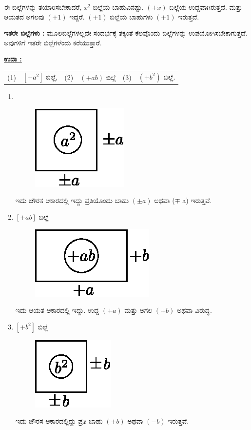 ಈ ಬಿಲ್ಲೆಗಳನ್ನು ತಯಾರಿಸಬೇಕಾದರೆ, $x^2$ ಬಿಲ್ಲೆಯ ಬಾಹುವಿನಷ್ಟು. $(+x)$ ಬಿಲ್ಲೆಯ ಉದ್ದವಾಗಿರುತ್ತದೆ. ಮತ್ತು ಆಯತದ ಅಗಲವು $(+1)$ ಇದ್ದರೆ.  $(+1)$ ಬಿಲ್ಲೆಯ ಬಾಹುಗಳು $(+1)$ ಇರುತ್ತದೆ.

\noindent
\textbf{ಇತರೇ ಬಿಲ್ಲೆಗಳು :} ಮೂಲಬಿಲ್ಲೆಗಳಲ್ಲದೇ ಸಂದರ್ಭಕ್ಕೆ ತಕ್ಕಂತೆ ಕೆಲವೊಂದು ಬಿಲ್ಲೆಗಳನ್ನು ಉಪಯೋಗಿಸಬೇಕಾಗುತ್ತದೆ. ಅವುಗಳಿಗೆ ಇತರೇ ಬಿಲ್ಲೆಗಳೆಂದು ಕರೆಯುತ್ತಾರೆ.

\noindent
{\textbf{\underline{ಉದಾ :}}} 
\begin{tabular}{llllll}
(1) & $[+ a^2]$ ಬಿಲ್ಲೆ, & (2) & $(+ab)$ ಬಿಲ್ಲೆ & (3) & $(+b^2)$ ಬಿಲ್ಲೆ. 
\end{tabular}

\begin{enumerate}
\item 
~
\begin{figure}[H]
\centering
\includegraphics[scale=0.8]{src/figure/chap3/fig3-5a.eps}
\end{figure}
ಇದು ಚೌರಸ ಆಕಾರದಲ್ಲಿ ಇದ್ದು ಪ್ರತಿಯೊಂದು ಬಾಹು $(\pm a)$ ಅಥವಾ ($\mp$ a) ಇರುತ್ತವೆ. 

\item $[+ab]$ ಬಿಲ್ಲೆ
\begin{figure}[H]
\centering
\includegraphics[scale=0.8]{src/figure/chap3/fig3-5b.eps}
\end{figure}
ಇದು ಆಯತ ಆಕಾರದಲ್ಲಿ ಇದ್ದು. ಉದ್ದ $(+a)$ ಮತ್ತು ಅಗಲ $(+b)$ ಅಥವಾ ವಿರುದ್ಧ.

\item $[+b^{2}]$	 ಬಿಲ್ಲೆ
\begin{figure}[H]
\centering
\includegraphics[scale=0.8]{src/figure/chap3/fig3-5c.eps}
\end{figure}
ಇದು ಚೌರಸ ಆಕಾರದಲ್ಲಿದ್ದು ಪ್ರತಿ ಬಾಹು $(+b)$ ಅಥವಾ $(-b)$ ಇರುತ್ತವೆ.


\end{enumerate}
